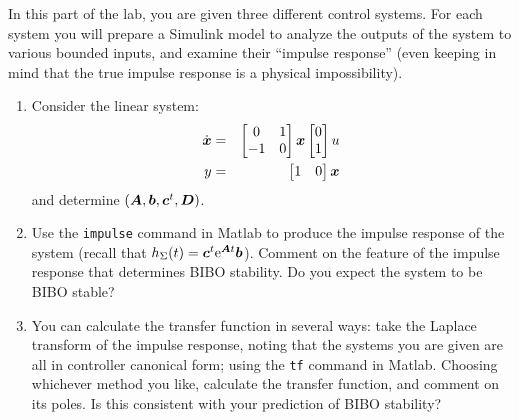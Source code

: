 In this part of the lab, you are given three different control systems.  For
each system you will prepare a \textsf{Simulink} model to analyze the outputs
of the system to various bounded inputs, and examine their ``impulse
response'' (even keeping in mind that the true impulse response is a physical
impossibility).
\begin{enumerate}
    \item Consider the linear system:
          \begin{eqnarray*}
              \dot{\boldsymbol{x}}&=&\begin{bmatrix}0&1\\-1&0\\\end{bmatrix}\boldsymbol{x}
              \begin{bmatrix}0\\1\end{bmatrix}u\\
              y&=&\begin{bmatrix}1&0\end{bmatrix}\boldsymbol{x}
          \end{eqnarray*}
          and determine \((\boldsymbol{A},\boldsymbol{b},\boldsymbol{c}^{t},\boldsymbol{D})\).

    \item Use the \verb|impulse| command in \textsf{Matlab} to produce the
          impulse response of the system (recall that
          \(h_{\Sigma}(t)=\boldsymbol{c}^{t}\textup{e}^{\boldsymbol{A}t}\boldsymbol{b}\)). Comment on the feature
          of the impulse response that determines BIBO stability. Do you expect the
          system to be BIBO stable?

    \item You can calculate the transfer function in several ways: take the
          Laplace transform of the impulse response, noting that the systems you are
          given are all in controller canonical form; using the \verb|tf| command in
          \textsf{Matlab}\@.  Choosing whichever method you like, calculate the
          transfer function, and comment on its poles. Is this consistent with your
          prediction of BIBO stability?


\end{enumerate}
